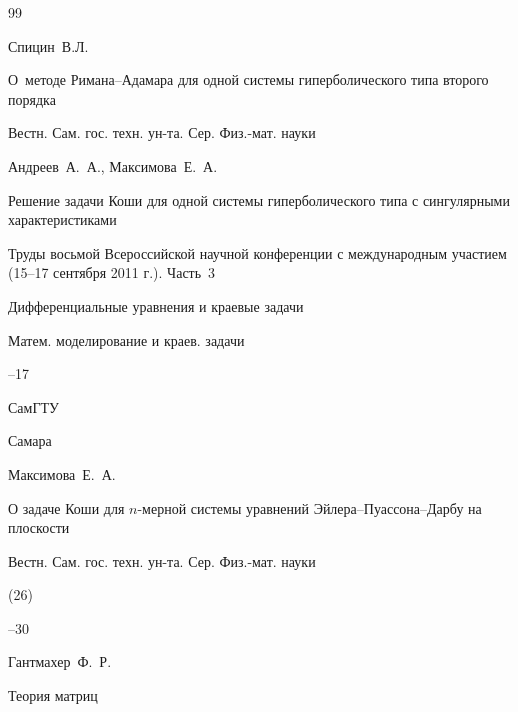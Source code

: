 \begin{thebibliography}{99}

\by  Спицин~В.Л.

\paper О~методе Римана--Адамара для одной системы гиперболического типа второго порядка

\jour  Вестн. Сам. гос. техн. ун-та. Сер. Физ.-мат. науки














\by Андреев~А.~А., Максимова~Е.~А.

\paper Решение задачи Коши для одной системы гиперболического типа с сингулярными характеристиками

\inbook Труды восьмой Всероссийской научной конференции с международным участием \rm (15--17 сентября 2011 г.). Часть~3

\bookinfo Дифференциальные уравнения и краевые задачи

\serial Матем. моделирование и краев. задачи


--17

\publ СамГТУ

\publaddr Самара







\by  Максимова~Е.~А.

\paper О задаче Коши для $n$-мерной системы уравнений Эйлера--Пуассона--Дарбу на плоскости

\jour Вестн. Сам. гос. техн. ун-та. Сер. Физ.-мат. науки


(26)

--30






\by Гантмахер~Ф.~Р. 

\book Теория матриц


\end{thebibliography}
